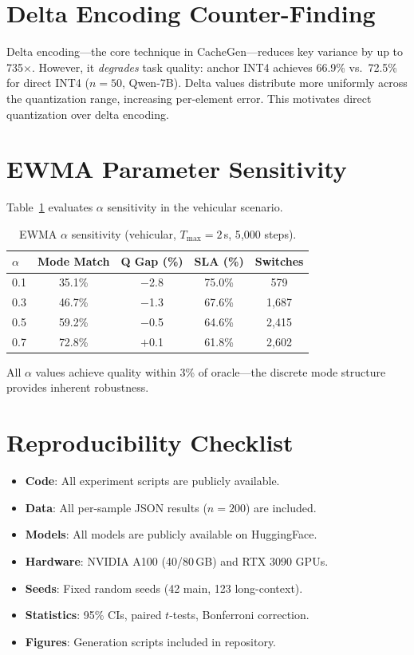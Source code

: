 \documentclass{article}
\begin{document}
\section{Delta Encoding Counter-Finding}
\label{app:delta}

Delta encoding---the core technique in CacheGen---reduces key variance by up to 735$\times$.
However, it \emph{degrades} task quality: anchor INT4 achieves 66.9\% vs.\ 72.5\% for direct INT4 ($n = 50$, Qwen-7B).
Delta values distribute more uniformly across the quantization range, increasing per-element error.
This motivates direct quantization over delta encoding.

\section{EWMA Parameter Sensitivity}
\label{app:alpha}

Table~\ref{tab:alpha_sensitivity} evaluates $\alpha$ sensitivity in the vehicular scenario.

\begin{table}[t]
\centering
\caption{EWMA $\alpha$ sensitivity (vehicular, $T_{\max} = 2$\,s, 5{,}000 steps).}
\label{tab:alpha_sensitivity}
\footnotesize
\begin{tabular}{@{}lcccc@{}}
\toprule
$\alpha$ & \textbf{Mode Match} & \textbf{Q Gap (\%)} & \textbf{SLA (\%)} & \textbf{Switches} \\
\midrule
0.1 & 35.1\% & $-$2.8 & 75.0\% & 579  \\
0.3 & 46.7\% & $-$1.3 & 67.6\% & 1{,}687 \\
0.5 & 59.2\% & $-$0.5 & 64.6\% & 2{,}415 \\
0.7 & 72.8\% & $+$0.1 & 61.8\% & 2{,}602 \\
\bottomrule
\end{tabular}
\end{table}

All $\alpha$ values achieve quality within 3\% of oracle---the discrete mode structure provides inherent robustness.

\section{Reproducibility Checklist}
\label{app:repro}

\begin{itemize}
    \item \textbf{Code}: All experiment scripts are publicly available.
    \item \textbf{Data}: All per-sample JSON results ($n = 200$) are included.
    \item \textbf{Models}: All models are publicly available on HuggingFace.
    \item \textbf{Hardware}: NVIDIA A100 (40/80\,GB) and RTX 3090 GPUs.
    \item \textbf{Seeds}: Fixed random seeds (42 main, 123 long-context).
    \item \textbf{Statistics}: 95\% CIs, paired $t$-tests, Bonferroni correction.
    \item \textbf{Figures}: Generation scripts included in repository.
\end{itemize}
\end{document}
